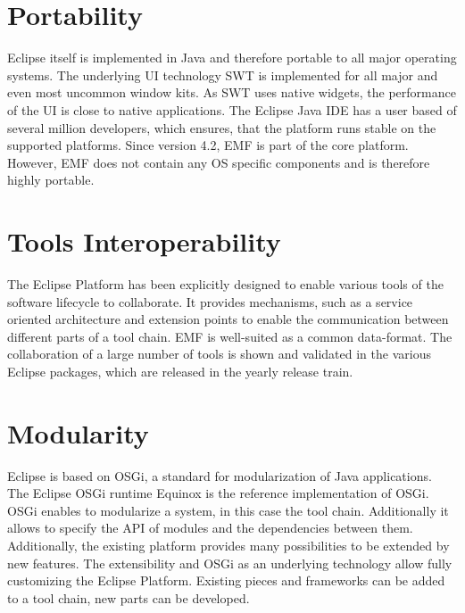\section{Portability}
Eclipse itself is implemented in Java and therefore portable to all major operating systems. The underlying UI technology SWT is implemented for all major and even most uncommon window kits. As SWT uses native widgets, the performance of the UI is close to native applications. The Eclipse Java IDE has a user based of several million developers, which ensures, that the platform runs stable on the supported platforms. Since version 4.2, EMF is part of the core platform. However, EMF does not contain any OS specific components and is therefore highly portable.
\section{Tools Interoperability}
The Eclipse Platform has been explicitly designed to enable various tools of the software lifecycle to collaborate. It provides mechanisms, such as a service oriented architecture and extension points to enable the communication between different parts of a tool chain. EMF is well-suited as a common data-format. The collaboration of a large number of tools is shown and validated in the various Eclipse packages, which are released in the yearly release train.
\section{Modularity}
Eclipse is based on OSGi, a standard for modularization of Java applications. The Eclipse OSGi runtime Equinox is the reference implementation of OSGi. OSGi enables to modularize a system, in this case the tool chain. Additionally it allows to specify the API of modules and the dependencies between them. Additionally, the existing platform provides many possibilities to be extended by new features. The extensibility and OSGi as an underlying technology allow fully customizing the Eclipse Platform. Existing pieces and frameworks can be added to a tool chain, new parts can be developed.
